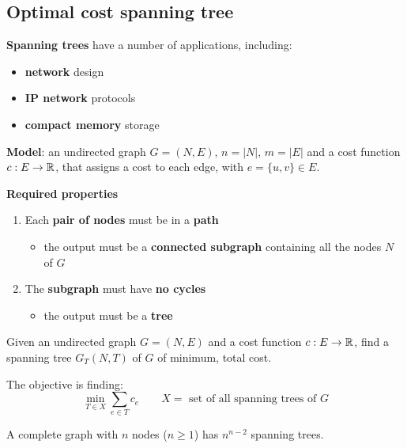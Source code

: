 \documentclass[english]{article}
\begin{document}
\newpage

\subsection{Optimal cost spanning tree}

\textbf{Spanning trees} have a number of applications, including:

\begin{itemize}
  \item \textbf{network} design
  \item \textbf{IP network} protocols
  \item \textbf{compact memory} storage
\end{itemize}

\bigskip
\textbf{Model}:
an undirected graph \(G = (N, E), \, n = |N|, \, m = |E|\) and a cost function \(c: E \rightarrow \mathbb{R}\), that assigns a cost to each edge, with \(e = \{u, v\} \in E\).

\bigskip
\textbf{Required properties}
\begin{enumerate}
  \item Each \textbf{pair of nodes} must be in a \textbf{path}
        \begin{itemize}[label= \(\Rightarrow\)]
          \item the output must be a \textbf{connected subgraph} containing all the nodes \(N\) of \(G\)
        \end{itemize}
  \item The \textbf{subgraph} must have \textbf{no cycles}
        \begin{itemize}[label= \(\Rightarrow\)]
          \item the output must be a \textbf{tree}
        \end{itemize}
\end{enumerate}

\bigskip
\begin{problem}
Given an undirected graph \(G = (N, E)\) and a cost function \(c: E \rightarrow \mathbb{R}\), find a spanning tree \(G_T(N, T)\) of \(G\) of minimum, total cost.

The objective is finding:
\[ \displaystyle \min_{T \in X} \sum_{e \in T} c_e \qquad X = \text{ set of all spanning trees of } G \]
\end{problem}

\begin{theorem}
  A complete graph with \(n\) nodes (\(n \geq 1\)) has \(n^{n-2}\) spanning trees.
\end{theorem}
\end{document}
